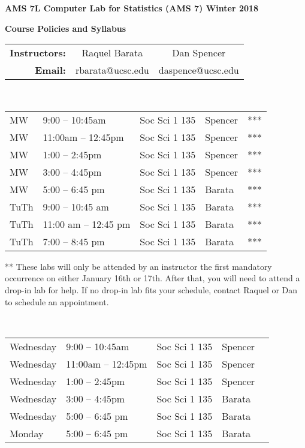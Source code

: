 \documentclass[11pt]{article}
\begin{document}
\begin{center}
{\Large {\bf AMS 7L \hfill Computer Lab for Statistics (AMS 7) \hfill Winter 2018}
}

\vspace{.3in}
{\Large {\bf Course Policies and Syllabus}}
\vspace{.25in}

\begin{tabular}{rcc} 
{\bf Instructors:}   &  Raquel Barata & Dan Spencer \\
{\bf Email:} & rbarata@ucsc.edu & daspence@ucsc.edu
\end{tabular}
\end{center}

\vspace{.2in}

 \\
\begin{tabular}{l l l l l}
	MW & 9:00 -- 10:45am & Soc Sci 1 135 & Spencer & *** \\
	MW & 11:00am -- 12:45pm & Soc Sci 1 135 & Spencer & ***\\
	MW & 1:00 -- 2:45pm & Soc Sci 1 135 & Spencer & ***\\
	MW & 3:00 -- 4:45pm & Soc Sci 1 135 & Spencer & ***\\
	MW & 5:00 -- 6:45 pm & Soc Sci 1 135 & Barata & ***  \\
	TuTh & 9:00 -- 10:45 am & Soc Sci 1 135 & Barata & ***\\
	TuTh & 11:00 am -- 12:45 pm& Soc Sci 1 135 & Barata & *** \\
	TuTh & 7:00 -- 8:45 pm & Soc Sci 1 135 & Barata & *** \\
\end{tabular}

\vspace{0.15in}

\noindent*** These labs will only be attended by an instructor the first mandatory occurrence on either January 16th or 17th. After that, you will need to attend a drop-in lab for help. If no drop-in lab fits your schedule, contact Raquel or Dan to schedule an appointment.
\vspace{0.3in}

 \\
\begin{tabular}{l l l l l}
	Wednesday & 9:00 -- 10:45am & Soc Sci 1 135 & Spencer & \\
	Wednesday & 11:00am -- 12:45pm & Soc Sci 1 135 & Spencer &\\
	Wednesday& 1:00 -- 2:45pm & Soc Sci 1 135 & Spencer &\\
	Wednesday & 3:00 -- 4:45pm & Soc Sci 1 135 & Barata &\\
	Wednesday & 5:00 -- 6:45 pm & Soc Sci 1 135 & Barata &   \\
	Monday & 5:00 -- 6:45 pm & Soc Sci 1 135 & Barata &  \\
\end{tabular}
\vspace{0.15in}
\end{document}
